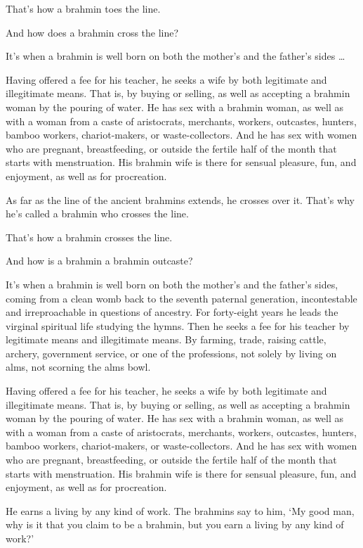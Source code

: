 \documentclass[12pt,openany]{book}%
\begin{document}
That’s how a brahmin toes the line. 

And how does a brahmin cross the line? 

It’s when a brahmin is well born on both the mother’s and the father’s sides … 

Having offered a fee for his teacher, he seeks a wife by both legitimate and illegitimate means. That is, by buying or selling, as well as accepting a brahmin woman by the pouring of water. He has sex with a brahmin woman, as well as with a woman from a caste of aristocrats, merchants, workers, outcastes, hunters, bamboo workers, chariot-makers, or waste-collectors. And he has sex with women who are pregnant, breastfeeding, or outside the fertile half of the month that starts with menstruation. His brahmin wife is there for sensual pleasure, fun, and enjoyment, as well as for procreation. 

As far as the line of the ancient brahmins extends, he crosses over it. That’s why he’s called a brahmin who crosses the line. 

That’s how a brahmin crosses the line. 

And how is a brahmin a brahmin outcaste? 

It’s when a brahmin is well born on both the mother’s and the father’s sides, coming from a clean womb back to the seventh paternal generation, incontestable and irreproachable in questions of ancestry. For forty-eight years he leads the virginal spiritual life studying the hymns. Then he seeks a fee for his teacher by legitimate means and illegitimate means. By farming, trade, raising cattle, archery, government service, or one of the professions, not solely by living on alms, not scorning the alms bowl. 

Having offered a fee for his teacher, he seeks a wife by both legitimate and illegitimate means. That is, by buying or selling, as well as accepting a brahmin woman by the pouring of water. He has sex with a brahmin woman, as well as with a woman from a caste of aristocrats, merchants, workers, outcastes, hunters, bamboo workers, chariot-makers, or waste-collectors. And he has sex with women who are pregnant, breastfeeding, or outside the fertile half of the month that starts with menstruation. His brahmin wife is there for sensual pleasure, fun, and enjoyment, as well as for procreation. 

He earns a living by any kind of work. The brahmins say to him, ‘My good man, why is it that you claim to be a brahmin, but you earn a living by any kind of work?’ 
\end{document}
